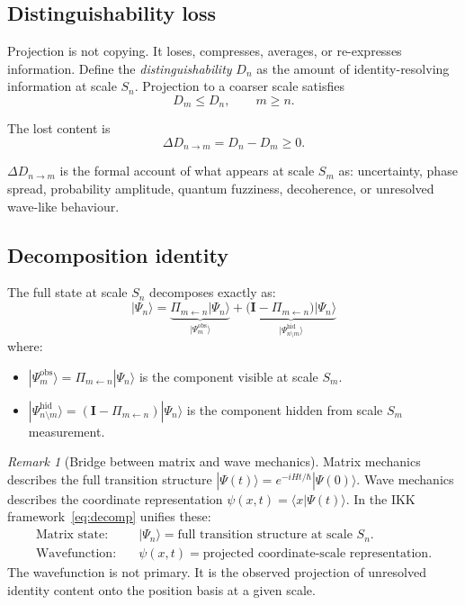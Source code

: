 \documentclass[11pt, a4paper, oneside]{article}
\theoremstyle{definition}
\theoremstyle{plain}
\theoremstyle{remark}
\newtheorem{remark}{Remark}[section]
\newcommand{\Proj}[2]{\Pi_{#1 \leftarrow #2}}
\newcommand{\Psiobs}{|\Psi^{\mathrm{obs}}_m\rangle}
\newcommand{\Psihid}{|\Psi^{\mathrm{hid}}_{n \setminus m}\rangle}
\begin{document}
\subsection{Distinguishability loss}

Projection is not copying.
It loses, compresses, averages, or re-expresses information.
Define the \emph{distinguishability} $D_n$ as the amount of
identity-resolving information at scale $S_n$.
Projection to a coarser scale satisfies
\begin{equation}
  D_m \leq D_n, \qquad m \geq n.
  \label{eq:D_loss}
\end{equation}

The lost content is
\begin{equation}
  \Delta D_{n \to m} = D_n - D_m \geq 0.
  \label{eq:D_gap}
\end{equation}

\noindent
$\Delta D_{n \to m}$ is the formal account of what appears at scale $S_m$ as:
uncertainty, phase spread, probability amplitude, quantum fuzziness,
decoherence, or unresolved wave-like behaviour.

\subsection{Decomposition identity}

The full state at scale $S_n$ decomposes exactly as:
\begin{equation}
  \boxed{
    |\Psi_n\rangle
    = \underbrace{\Proj{m}{n}|\Psi_n\rangle}_{\Psiobs}
    + \underbrace{\bigl(\mathbf{I} - \Proj{m}{n}\bigr)|\Psi_n\rangle}_{\Psihid}
  }
  \label{eq:decomp}
\end{equation}
where:
\begin{itemize}
  \item $\Psiobs = \Proj{m}{n}|\Psi_n\rangle$
    is the component visible at scale $S_m$.
  \item $\Psihid = (\mathbf{I} - \Proj{m}{n})|\Psi_n\rangle$
    is the component hidden from scale $S_m$ measurement.
\end{itemize}

\begin{remark}[Bridge between matrix and wave mechanics]
  Matrix mechanics describes the full transition structure
  $|\Psi(t)\rangle = e^{-iHt/\hbar}|\Psi(0)\rangle$.
  Wave mechanics describes the coordinate representation
  $\psi(x,t) = \langle x|\Psi(t)\rangle$.
  In the IKK framework~\eqref{eq:decomp} unifies these:
  \begin{align}
    \text{Matrix state:} &\quad
      |\Psi_n\rangle = \text{full transition structure at scale } S_n. \\
    \text{Wavefunction:} &\quad
      \psi(x,t) = \text{projected coordinate-scale representation.}
  \end{align}
  The wavefunction is not primary.
  It is the observed projection of unresolved identity content onto the
  position basis at a given scale.
\end{remark}
\end{document}
